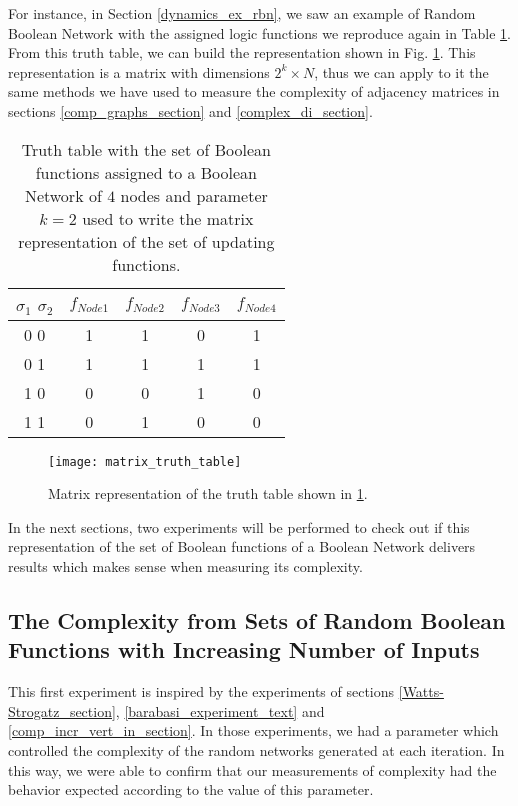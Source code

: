 For instance, in Section \ref{dynamics_ex_rbn}, we saw an example of Random Boolean Network with the assigned logic functions we reproduce again in Table \ref{tab:example_truth_table2}. From this truth table, we can build the representation shown in Fig. \ref{fig:matrix_truth_table}. This representation is a matrix with dimensions $2^{k} \times N$, thus we can apply to it the same methods we have used to measure the complexity of adjacency matrices in sections \ref{comp_graphs_section} and \ref{complex_di_section}.\\

\begin{table}[h]
\centering
\begin{tabular}{ |c||c|c|c|c| } 
 \hline
 $\sigma_{1}$	$\sigma_{2}$ & $f_{Node 1}$ & $f_{Node 2}$ & $f_{Node 3}$ & $f_{Node 4}$ \\ 
 \hline
 \hline
 0	0 & 1& 1& 0& 1\\ 
 \hline
 0	1 & 1& 1& 1& 1\\
 \hline
 1	0 & 0& 0& 1& 0\\
 \hline
 1	1 & 0& 1& 0& 0\\
 \hline
\end{tabular}
 \caption{Truth table with the set of Boolean functions assigned to a Boolean Network of $4$ nodes and parameter $k=2$ used to write the matrix representation of the set of updating functions.}
 \label{tab:example_truth_table2}
\end{table}

\begin{figure}[h]
\centering
\texttt{[image: matrix\_truth\_table]}
\caption[Matrix representation of a set of Boolean functions.]{Matrix representation of the truth table shown in \ref{tab:example_truth_table2}.}
\label{fig:matrix_truth_table}
\end{figure}

In the next sections, two experiments will be performed to check out if this representation of the set of Boolean functions of a Boolean Network delivers results which makes sense when measuring its complexity.

\subsection{The Complexity from Sets of Random Boolean Functions with Increasing Number of Inputs}
This first experiment is inspired by the experiments of sections \ref{Watts-Strogatz_section}, \ref{barabasi_experiment_text} and \ref{comp_incr_vert_in_section}. In those experiments, we had a parameter which controlled the complexity of the random networks generated at each iteration. In this way, we were able to confirm that our measurements of complexity had the behavior expected according to the value of this parameter.\\

